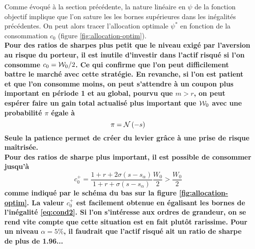 \documentclass{article}
\numberwithin{equation}{section}
\begin{document}
Comme évoqué à la section précédente, la nature linéaire en $\psi$ de la fonction objectif implique que l'on sature les les bornes supérieures dans les inégalités précédentes. On peut alors tracer l'allocation optimale $\psi^*$ en fonction de la consommation $c_0$ (figure \ref{fig:allocation-optim}).\\

\textbf{\color{awesomePurple}Pour des ratios de sharpes plus petit que le niveau exigé par l'aversion au risque du porteur, il est inutile d'investir dans l'actif risqué si l'on consomme $c_0 = \mathcal{W}_0/2$. Ce qui confirme que l'on peut difficilement battre le marché avec cette stratégie. En revanche, si l'on est patient et que l'on consomme moins, on peut s'attendre à un coupon plus important en période 1 et au global, pourvu que $m>r$, on peut espérer faire un gain total actualisé plus important que $\mathcal{W}_0$ avec une probabilité $\pi$ égale à
\begin{equation}
\pi = \mathcal{N}\left( -s \right)
\end{equation}
Seule la patience permet de créer du levier grâce à une prise de risque maîtrisée.}\\

\textbf{\color{awesomePurple}Pour des ratios de sharpe plus important, il est possible de consommer jusqu'à 
\begin{equation}
c^+_0 = \frac{1 + r + 2\sigma\left( s - s_\alpha \right)}{1 + r + \sigma\left( s - s_\alpha \right)}\frac{W_0}{2}> \frac{W_0}{2}
\end{equation}
comme indiqué par le schéma du bas sur la figure \ref{fig:allocation-optim}. La valeur $c_0^+$ est facilement obtenue en égalisant les bornes de l'inégalité \eqref{eq:cond2}. Si l'on s'intéresse aux ordres de grandeur, on se rend vite compte que cette situation est en fait plutôt rarissime. Pour un niveau $\alpha = 5\%$, il faudrait que l'actif risqué ait un ratio de sharpe de plus de 1.96...}\\
\end{document}
